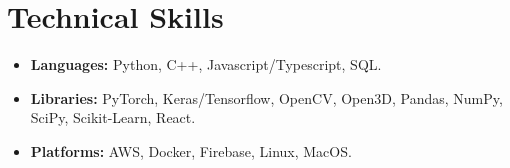 \documentclass[a4paper,11pt]{article}
\newcommand{\resumeItem}[1]{
  \item\small{#1}
}
\newcommand{\resumeItemListStart}{
  \begin{itemize}[rightmargin=0.11in, itemsep=2pt, topsep=4pt, parsep=0pt, partopsep=0pt]
}
\newcommand{\resumeItemListEnd}{\end{itemize}}
\begin{document}
\section{Technical Skills}
    \resumeItemListStart{}
        \resumeItem{\textbf{Languages:} Python, C++, Javascript/Typescript, SQL.}
        \resumeItem{\textbf{Libraries:} PyTorch, Keras/Tensorflow, OpenCV, Open3D, Pandas, NumPy, SciPy, Scikit-Learn, React.}
        \resumeItem{\textbf{Platforms:} AWS, Docker, Firebase, Linux, MacOS.}
    \resumeItemListEnd{}
\end{document}
